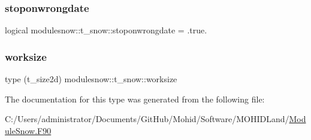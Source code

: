 \mbox{\label{structmodulesnow_1_1t__snow_a16c2a0efa75346f9b4eea7b59a5d3f13}} 
\subsubsection{\texorpdfstring{stoponwrongdate}{stoponwrongdate}}
{\footnotesize\ttfamily logical modulesnow\+::t\+\_\+snow\+::stoponwrongdate = .true.\hspace{0.3cm}{\ttfamily [private]}}

\mbox{\label{structmodulesnow_1_1t__snow_a123524f9c9eb18a361baceea7ca5a725}} 
\subsubsection{\texorpdfstring{worksize}{worksize}}
{\footnotesize\ttfamily type (t\+\_\+size2d) modulesnow\+::t\+\_\+snow\+::worksize\hspace{0.3cm}{\ttfamily [private]}}



The documentation for this type was generated from the following file\+:\begin{DoxyCompactItemize}
\item 
C\+:/\+Users/administrator/\+Documents/\+Git\+Hub/\+Mohid/\+Software/\+M\+O\+H\+I\+D\+Land/\mbox{\hyperlink{_module_snow_8_f90}{Module\+Snow.\+F90}}\end{DoxyCompactItemize}
